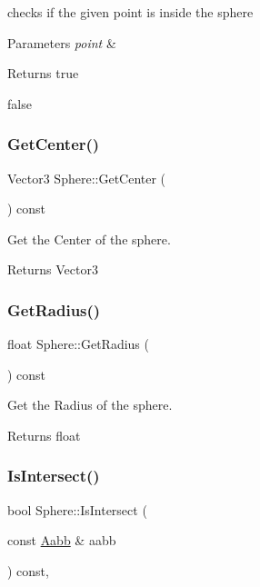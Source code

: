 checks if the given point is inside the sphere 


\begin{DoxyParams}{Parameters}
{\em point} & \\
\hline
\end{DoxyParams}
\begin{DoxyReturn}{Returns}
true 

false 
\end{DoxyReturn}
\mbox{\label{classSphere_ab0d5d17030115760a276545a1362ce93}} 
\subsubsection{\texorpdfstring{Get\+Center()}{GetCenter()}}
{\footnotesize\ttfamily Vector3 Sphere\+::\+Get\+Center (\begin{DoxyParamCaption}{ }\end{DoxyParamCaption}) const}



Get the Center of the sphere. 

\begin{DoxyReturn}{Returns}
Vector3 
\end{DoxyReturn}
\mbox{\label{classSphere_a1be9f865028172ade600ed25ca0aee4f}} 
\subsubsection{\texorpdfstring{Get\+Radius()}{GetRadius()}}
{\footnotesize\ttfamily float Sphere\+::\+Get\+Radius (\begin{DoxyParamCaption}{ }\end{DoxyParamCaption}) const}



Get the Radius of the sphere. 

\begin{DoxyReturn}{Returns}
float 
\end{DoxyReturn}
\mbox{\label{classSphere_aea1571e835842f502a64e4ddb30847e4}} 
\subsubsection{\texorpdfstring{Is\+Intersect()}{IsIntersect()}\hspace{0.1cm}{\footnotesize\ttfamily [1/2]}}
{\footnotesize\ttfamily bool Sphere\+::\+Is\+Intersect (\begin{DoxyParamCaption}\item[{const \hyperlink{classAabb}{Aabb} \&}]{aabb }\end{DoxyParamCaption}) const\hspace{0.3cm}{\ttfamily [override]}, {\ttfamily [virtual]}}



